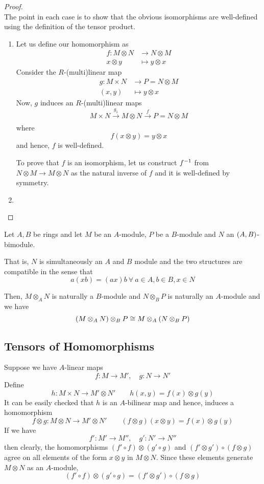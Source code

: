\begin{proof} \ \\
	The point in each case is to show that the obvious isomorphisms
	are well-defined using the definition of the tensor product.
	\begin{enumerate}
		\item Let us define our homomorphism as
		\begin{align*}
			f \colon M \otimes N &\to N \otimes M \\
			x \otimes y &\mapsto y \otimes x
		\end{align*}
		Consider the \(R\)-(multi)linear map
		\begin{align*}
			g \colon M \times N &\to P = N \otimes M \\
			(x, y) &\mapsto y \otimes x
		\end{align*}
		Now, \(g\) induces an \(R\)-(multi)linear maps
		\[
			M \times N \xrightarrow[\quad]{g_1} M \otimes N
			\xrightarrow[\quad]{f} P = N \otimes M
		\]
		where
		\[
			f(x \otimes y) = y \otimes x
		\]
		and hence, \(f\) is well-defined.

		To prove that \(f\) is an isomorphism, let us construct \(f^{-1}\)
		from \(N \otimes M \to M \otimes N\) as the natural inverse of
		\(f\) and it is well-defined by symmetry.


		\item
	\end{enumerate}
\end{proof}


\begin{exercise}{}{}
	Let \(A, B\) be rings and let \(M\) be an \(A\)-module, \(P\) be
	a \(B\)-module and \(N\) an \(\left( A, B \right)\)-bimodule.

	That is, \(N\) is simultaneously an \(A\) and \(B\) module and the two
	structures are compatible in the sense that
	\[
		a(xb) = (ax)b \ \forall\ a \in A, b \in B, x \in N
	\]

	Then, \(M \otimes_A N\) is naturally a \(B\)-module and
	\(N \otimes_B P\) is naturally an \(A\)-module and we have
	\[
		\left( M \otimes_A N \right) \otimes_B P \cong M \otimes_A
			\left( N \otimes_B P \right)
	\]
\end{exercise}

\subsection{Tensors of Homomorphisms}

Suppose we have \(A\)-linear maps
\[
	f \colon M \to M', \quad g \colon N \to N'
\]
Define
\[
	h \colon M \times N \to M' \otimes N'
	\quad\quad h(x, y) = f(x) \otimes g(y)
\]
It can be easily checked that \(h\) is an \(A\)-bilinear map
and hence, induces a homomorphism
\[
	f \otimes g \colon M \otimes N \to M' \otimes N'
	\quad\quad (f \otimes g)(x \otimes y) = f(x) \otimes g(y)
\]
If we have
\[
	f' \colon M' \to M'', \quad g' \colon N' \to N''
\]
then clearly, the homomorphisms
\((f' \circ f) \otimes (g' \circ g)\) and
\((f' \otimes g') \circ (f \otimes g)\) agree on all elements
of the form \(x \otimes y\) in \(M \otimes N\).
Since these elements generate \(M \otimes N\) as an \(A\)-module,
\[
	(f' \circ f) \otimes (g' \circ g) = (f' \otimes g') \circ (f \otimes g)
\]


